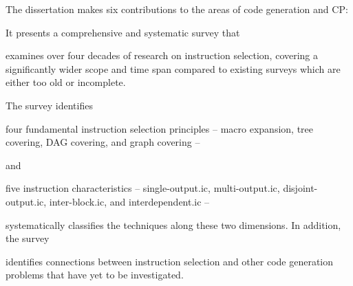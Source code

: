 The dissertation makes six contributions to the areas of \gls{code generation}
and \glsdesc{CP}:
%
\begin{contributions}
  \item {}
    It presents a comprehensive and systematic survey that
    \begin{contributions}
      \item {}
        examines over four decades of research on \gls{instruction selection},
        covering a significantly wider scope and time span compared to existing
        surveys \cite{Cattell:1977, GanapathiEtAl:1982:Survey, Lunell:1983,
          Leupers:2000:Survey, BoulytchevLomov:2001} which are either too old
        or incomplete.
    \end{contributions}
    The survey identifies%
    \begin{contributions}[resume]
      \item {}
        four fundamental \gls{instruction selection} \glspl{principle} --
        \gls{macro expansion}, \gls{tree covering}, \gls{DAG covering}, and
        \gls{graph covering} --
    \end{contributions}
    and
    \begin{contributions}[resume]
      \item {}
        five \glspl{instruction characteristic} -- \gls{single-output.ic},
        \gls{multi-output.ic}, \gls{disjoint-output.ic}, \gls{inter-block.ic},
        and \gls{interdependent.ic} --
    \end{contributions}
    systematically classifies the techniques along these two dimensions.
    In addition, the survey
    \begin{contributions}[resume]
      \item {}
        identifies connections between \gls{instruction selection} and other
        \gls{code generation} problems that have yet to be investigated.
    \end{contributions}


\end{contributions}
